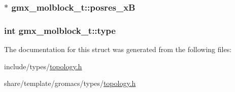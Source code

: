 \hypertarget{structgmx__molblock__t_a5aa9e1c390e5f72c288bbe62d8352d9d}{
\subsubsection[{posres\-\_\-x\-B}]{ $\ast$ {\bf gmx\-\_\-molblock\-\_\-t\-::posres\-\_\-x\-B}}}\label{structgmx__molblock__t_a5aa9e1c390e5f72c288bbe62d8352d9d}
\hypertarget{structgmx__molblock__t_ad0067f80b655c5a8086970db972f169c}{
\subsubsection[{type}]{\setlength{\rightskip}{0pt plus 5cm}int {\bf gmx\-\_\-molblock\-\_\-t\-::type}}}\label{structgmx__molblock__t_ad0067f80b655c5a8086970db972f169c}


\-The documentation for this struct was generated from the following files\-:\begin{DoxyCompactItemize}
\item 
include/types/\hyperlink{include_2types_2topology_8h}{topology.\-h}\item 
share/template/gromacs/types/\hyperlink{share_2template_2gromacs_2types_2topology_8h}{topology.\-h}\end{DoxyCompactItemize}
